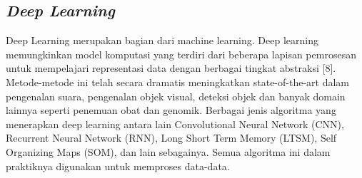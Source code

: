 \subsection{\emph{Deep Learning}}
Deep Learning merupakan bagian dari machine learning. Deep learning memungkinkan model komputasi yang terdiri dari beberapa lapisan pemrosesan untuk mempelajari representasi data dengan berbagai tingkat abstraksi [8]. Metode-metode ini telah secara dramatis meningkatkan state-of-the-art dalam pengenalan suara, pengenalan objek visual, deteksi objek dan banyak domain lainnya seperti penemuan obat dan genomik. Berbagai jenis algoritma yang menerapkan deep learning antara lain Convolutional Neural Network (CNN), Recurrent Neural Network (RNN), Long Short Term Memory (LTSM), Self Organizing Maps (SOM), dan lain sebagainya. Semua algoritma ini dalam praktiknya digunakan untuk memproses data-data.

